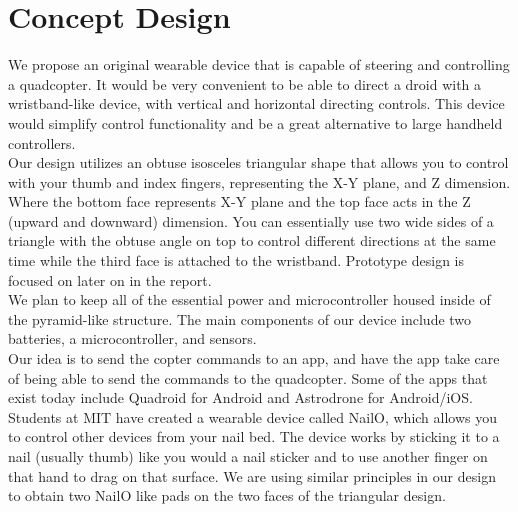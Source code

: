 \documentclass[12pt,letterpaper]{article}
\begin{document}
\section*{Concept Design}
\hspace{1cm}We propose an original wearable device that is capable of steering and controlling a quadcopter. It would be very convenient to be able to direct a droid with a wristband-like device, with vertical and horizontal directing controls. This device would simplify control functionality and be a great alternative to large handheld controllers.\\
\hspace{1cm}Our design utilizes an obtuse isosceles triangular shape that allows you to control with your thumb and index fingers, representing the X-Y plane, and Z dimension. Where the bottom face represents X-Y plane and the top face acts in the Z (upward and downward) dimension. You can essentially use two wide sides of a triangle with the obtuse angle on top to control different directions at the same time while the third face is attached to the wristband. Prototype design is focused on later on in the report.\\
\hspace{1cm}We plan to keep all of the essential power and microcontroller housed inside of the pyramid-like structure. The main components of our device include two batteries, a microcontroller, and sensors.\\
\hspace{1cm}Our idea is to send the copter commands to an app, and have the app take care of being able to send the commands to the quadcopter. Some of the apps that exist today include Quadroid for Android and Astrodrone for Android/iOS. \\
\hspace{1cm}Students at MIT have created a wearable device called NailO, which allows you to control other devices from your nail bed. The device works by sticking it to a nail (usually thumb) like you would a nail sticker and to use another finger on that hand to drag on that surface. We are using similar principles in our design to obtain two NailO like pads on the two faces of the triangular design. \\
\end{document}
